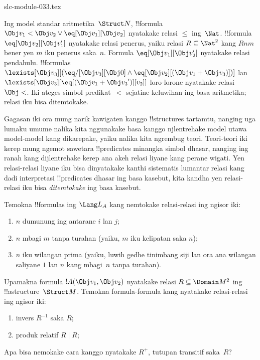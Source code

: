\begin{filecontents*}[overwrite]{slc-module-033.tex}
\begin{ex}
Ing model standar aritmetika~$\Struct N$, !!{formula} $\Obj
v_1 < \Obj v_2 \lor \eq[\Obj v_1][\Obj v_2]$
nyatakake relasi $\le$ ing~$\Nat$.
!!{formula} $\eq[\Obj v_2][\Obj v_1']$
nyatakake relasi penerus, yaiku relasi $R \subseteq
\Nat^2$ kang $Rnm$ bener yen $m$ iku penerus saka~$n$.
Formula $\eq[\Obj v_1][\Obj v_2']$
nyatakake relasi pendahulu. !!{formula}s
$\lexists[\Obj v_3][(\eq/[\Obj v_3][\Obj 0] \land
  \eq[\Obj v_2][(\Obj v_1 + \Obj v_3)])]$ lan
$\lexists[\Obj
  v_3][\eq[(\Obj v_1 + {\Obj v_3}')][v_2]]$
loro-lorone nyatakake relasi $\Obj <$.
Iki ateges simbol predikat~$<$ sejatine
keluwihan ing basa aritmetika; relasi iku
bisa ditemtokake.
\end{ex}

\begin{explain}
Gagasan iki ora mung narik kawigaten kanggo
!!{structure}s tartamtu, nanging uga lumaku
umume nalika kita nggunakake basa kanggo
njlentrehake model utawa model-model kang
dikarepake, yaiku nalika kita ngrembug teori.
Teori-teori iki kerep mung ngemot sawetara
!!{predicate}s minangka simbol dhasar, nanging
ing ranah kang dijlentrehake kerep ana akeh
relasi liyane kang perane wigati. Yen relasi-relasi
liyane iku bisa dinyatakake kanthi sistematis
lumantar relasi kang dadi interpretasi
!!{predicate}s dhasar ing basa kasebut,
kita kandha yen relasi-relasi iku bisa
\emph{ditemtokake} ing basa kasebut.
\end{explain}

\begin{prob}
Temokna !!{formula}s ing $\Lang L_A$ kang
nemtokake relasi-relasi ing ngisor iki:
\begin{enumerate}
\item $n$ dumunung ing antarane $i$ lan $j$;
\item $n$ mbagi $m$ tanpa turahan (yaiku, $m$
  iku kelipatan saka $n$);
\item $n$ iku wilangan prima (yaiku, luwih gedhe tinimbang siji lan ora ana
  wilangan saliyane $1$ lan $n$ kang mbagi~$n$
  tanpa turahan).
\end{enumerate}
\end{prob}

\begin{prob}
Upamakna formula $!A(\Obj v_1, \Obj v_2)$
nyatakake relasi $R
\subseteq \Domain M^2$ ing
!!a{structure}~$\Struct M$. Temokna formula-formula
kang nyatakake relasi-relasi ing ngisor iki:
\begin{enumerate}
\item invers $R^{-1}$ saka $R$;
\item produk relatif $R \mid R$;
\end{enumerate}
Apa bisa nemokake cara kanggo nyatakake $R^+$,
tutupan transitif saka~$R$?
\end{prob}


\end{filecontents*}
